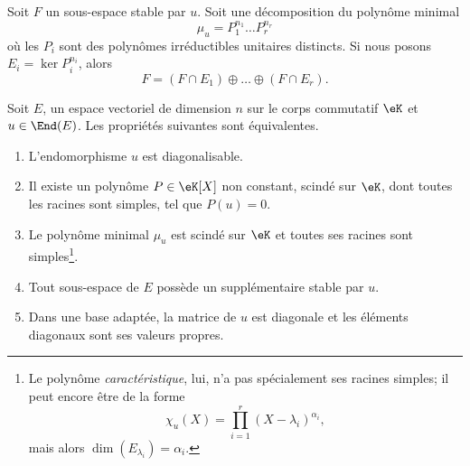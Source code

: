 \begin{lemma}       \label{LemgnaEOk}
	Soit \( F\) un sous-espace stable par \( u\). Soit une décomposition du polynôme minimal
	\begin{equation}
		\mu_u=P_1^{n_1}\ldots P_r^{n_r}
	\end{equation}
	où les \( P_i\) sont des polynômes irréductibles unitaires distincts. Si nous posons \( E_i=\ker P_i^{n_i}\), alors
	\begin{equation}
		F=(F\cap E_1)\oplus\ldots \oplus(F\cap E_r).
	\end{equation}
\end{lemma}

\begin{theorem}     \label{ThoDigLEQEXR}
	Soit \( E\), un espace vectoriel de dimension \( n\) sur le corps commutatif \( \eK\) et \( u\in\End(E)\). Les propriétés suivantes sont équivalentes.
	\begin{enumerate}
		\item       \label{ItemThoDigLEQEXRiv}
		      L'endomorphisme \( u\) est diagonalisable.
		\item       \label{ItemThoDigLEQEXRi}
		      Il existe un polynôme \( P\in\eK[X]\) non constant, scindé sur \(\eK\), dont toutes les racines sont simples, tel que \( P(u)=0\).
		\item       \label{ItemThoDigLEQEXRii}
		      Le polynôme minimal \( \mu_u\) est scindé sur \(\eK\) et toutes ses racines sont simples\footnote{Le polynôme \emph{caractéristique}, lui, n'a pas spécialement ses racines simples; il peut encore être de la forme
			      \begin{equation}
				      \chi_u(X)=\prod_{i=1}^r(X-\lambda_i)^{\alpha_i},
			      \end{equation}
			      mais alors \( \dim(E_{\lambda_i})=\alpha_i\). }.
		\item       \label{ItemThoDigLEQEXRiii}
		      Tout sous-espace de \( E\) possède un supplémentaire stable par \( u\).
		\item       \label{ITEMooZNJFooEiqDYp}
		      Dans une base adaptée, la matrice de \( u\) est diagonale et les éléments diagonaux sont ses valeurs propres.
	\end{enumerate}
\end{theorem}

